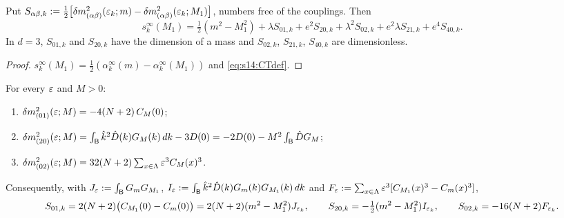 \begin{lemma}[structure]\label{lem:s14:struct}
Put $S_{\alpha\beta,k}:=\frac12\big[\delta m^2_{(\alpha\beta)}(\varepsilon_k;m)-\delta m^2_{(\alpha\beta)}(\varepsilon_k;M_1)\big]$, numbers free of the couplings. Then
\begin{equation}\label{eq:s14:struct}
s^\infty_k(M_1)=\tfrac12(m^2-M_1^2)+\lambda S_{01,k}+e^2S_{20,k}+\lambda^2S_{02,k}+e^2\lambda S_{21,k}+e^4S_{40,k}.
\end{equation}
In $d=3$, $S_{01,k}$ and $S_{20,k}$ have the dimension of a mass and $S_{02,k}$, $S_{21,k}$, $S_{40,k}$ are dimensionless.
\end{lemma}

\begin{proof}
$s^\infty_k(M_1)=\frac12(\alpha^\infty_k(m)-\alpha^\infty_k(M_1))$ and \eqref{eq:s14:CTdef}.
\end{proof}

\begin{lemma}\label{lem:s14:low}
For every $\varepsilon$ and $M>0$:
\begin{enumerate}[label=\textup{(\roman*)},leftmargin=*,nosep]
\item $\delta m^2_{(01)}(\varepsilon;M)=-4(N+2)\,C_M(0)$;
\item $\delta m^2_{(20)}(\varepsilon;M)=\int_{\mathsf B}\hat k^2\hat D(k)G_M(k)\,dk-3D(0)=-2D(0)-M^2\int_{\mathsf B}\hat DG_M$;
\item $\delta m^2_{(02)}(\varepsilon;M)=32(N+2)\sum_{x\in\Lambda}\varepsilon^3C_M(x)^3$.
\end{enumerate}
Consequently, with $J_{\varepsilon}:=\int_{\mathsf B} G_mG_{M_1}$, $I_{\varepsilon}:=\int_{\mathsf B}\hat k^2\hat D(k)G_m(k)G_{M_1}(k)\,dk$ and $F_{\varepsilon}:=\sum_{x\in\Lambda}\varepsilon^3[C_{M_1}(x)^3-C_m(x)^3]$,
\begin{equation}\label{eq:s14:lowcoef}
S_{01,k}=2(N+2)\big(C_{M_1}(0)-C_m(0)\big)=2(N+2)(m^2-M_1^2)J_{\varepsilon_k},\qquad S_{20,k}=-\tfrac12(m^2-M_1^2)I_{\varepsilon_k},\qquad S_{02,k}=-16(N+2)F_{\varepsilon_k}.
\end{equation}
\end{lemma}

